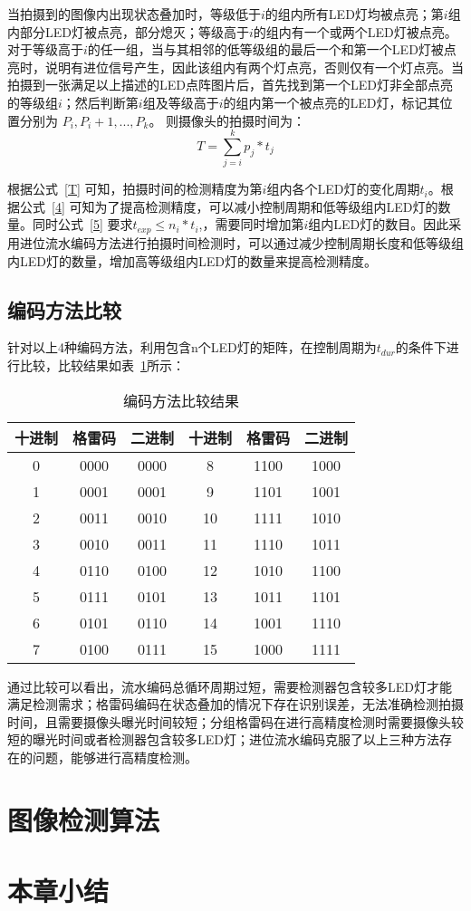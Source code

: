 当拍摄到的图像内出现状态叠加时，等级低于$i$的组内所有LED灯均被点亮；第$i$组内部分LED灯被点亮，部分熄灭；等级高于$i$的组内有一个或两个LED灯被点亮。对于等级高于$i$的任一组，当与其相邻的低等级组的最后一个和第一个LED灯被点亮时，说明有进位信号产生，因此该组内有两个灯点亮，否则仅有一个灯点亮。当拍摄到一张满足以上描述的LED点阵图片后，首先找到第一个LED灯非全部点亮的等级组$i$；然后判断第$i$组及等级高于$i$的组内第一个被点亮的LED灯，标记其位置分别为 $P_i, P_i + 1, ..., P_k$。 则摄像头的拍摄时间为：
  
\begin{equation}
T = \sum_{j=i}^k p_j * t_j
	\label{T}
\end{equation}

根据公式~\ref{T} 可知，拍摄时间的检测精度为第$i$组内各个LED灯的变化周期$t_i$。根据公式~\ref{4} 可知为了提高检测精度，可以减小控制周期和低等级组内LED灯的数量。同时公式~\ref{5} 要求$t_{exp} \le n_i * t_i$,，需要同时增加第$i$组内LED灯的数目。因此采用进位流水编码方法进行拍摄时间检测时，可以通过减少控制周期长度和低等级组内LED灯的数量，增加高等级组内LED灯的数量来提高检测精度。

\subsection{编码方法比较}

针对以上4种编码方法，利用包含n个LED灯的矩阵，在控制周期为$t_{dur}$的条件下进行比较，比较结果如表~\ref{comp}所示：

\begin{table}[h]
  \centering
  \caption{编码方法比较结果} 
  \label{comp}
  \begin{tabular}{|c|c|c|c|c|c|}\hline
  十进制 & 格雷码 & 二进制 & 十进制 & 格雷码 & 二进制 \\ \hline
  0 & 0000 & 0000 & 8 & 1100 & 1000 \\ \hline
  1 & 0001 & 0001 & 9 & 1101 & 1001 \\ \hline
  2 & 0011 & 0010 & 10 & 1111 & 1010 \\ \hline
  3 & 0010 & 0011 & 11 & 1110 & 1011 \\ \hline
  4 & 0110 & 0100 & 12 & 1010 & 1100 \\ \hline
  5 & 0111 & 0101 & 13 & 1011 & 1101 \\ \hline
  6 & 0101 & 0110 & 14 & 1001 & 1110 \\ \hline
  7 & 0100 & 0111 & 15 & 1000 & 1111 \\ \hline
  \end{tabular}
\end{table}

通过比较可以看出，流水编码总循环周期过短，需要检测器包含较多LED灯才能满足检测需求；格雷码编码在状态叠加的情况下存在识别误差，无法准确检测拍摄时间，且需要摄像头曝光时间较短；分组格雷码在进行高精度检测时需要摄像头较短的曝光时间或者检测器包含较多LED灯；进位流水编码克服了以上三种方法存在的问题，能够进行高精度检测。

\section{图像检测算法}



\section{本章小结}

